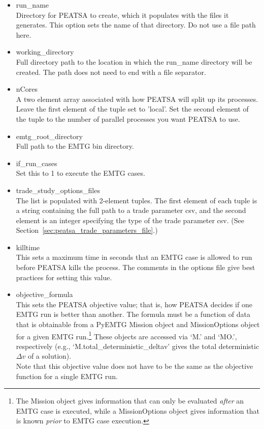 \begin{itemize}
	\item run\_name \\ Directory for \ac{PEATSA} to create, which it populates with the files it generates. This option sets the name of that directory. Do not use a file path here.
	\item working\_directory \\ Full directory path to the location in which the run\_name directory will be created. The path does not need to end with a file separator.
	\item nCores \\ A two element array associated with how \ac{PEATSA} will split up its processes. Leave the first element of the tuple set to 'local'. Set the second element of the tuple to the number of parallel processes you want \ac{PEATSA} to use.
	\item emtg\_root\_directory \\  Full path to the \ac{EMTG} bin directory.
	\item if\_run\_cases \\ Set this to 1 to execute the \ac{EMTG} cases.
	\item trade\_study\_options\_files \\ The list is populated with 2-element tuples. The first element of each tuple is a string containing the full path to a trade parameter csv, and the second element is an integer specifying the type of the trade parameter csv. (See Section~\ref{sec:peatsa_trade_parameters_file}.)
	\item killtime \\ This sets a maximum time in seconds that an \ac{EMTG} case is allowed to run before \ac{PEATSA} kills the process. The comments in the options file give best practices for setting this value.
	\item objective\_formula \\ This sets the \ac{PEATSA} objective value; that is, how \ac{PEATSA} decides if one \ac{EMTG} run is better than another. The formula must be a function of data that is obtainable from a PyEMTG Mission object and MissionOptions object for a given \ac{EMTG} run.\footnote{The Mission object gives information that can only be evaluated \emph{after} an \ac{EMTG} case is executed, while a MissionOptions object gives information that is known \emph{prior} to \ac{EMTG} case execution.} These objects are accessed via `M.' and `MO.', respectively (e.g., `M.total\_deterministic\_deltav' gives the total deterministic $\Delta v$ of a solution). \\ Note that this objective value does not have to be the same as the objective function for a single \ac{EMTG} run.

\end{itemize}
